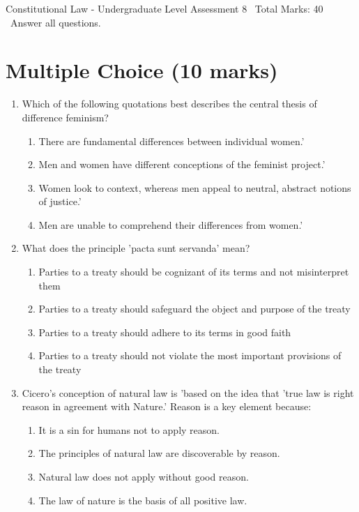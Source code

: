 \documentclass[12pt]{article}
\begin{document}
\begin{center}
Constitutional Law - Undergraduate Level Assessment 8 \
Total Marks: 40 \
Answer all questions.
\end{center}

\section*{Multiple Choice (10 marks)}
\begin{enumerate}[label=\arabic*.]
\item Which of the following quotations best describes the central thesis of difference feminism?
\begin{enumerate}[label=(\alph*)]
    \item There are fundamental differences between individual women.'
    \item Men and women have different conceptions of the feminist project.'
    \item Women look to context, whereas men appeal to neutral, abstract notions of justice.'
    \item Men are unable to comprehend their differences from women.'
\end{enumerate}
\item What does the principle 'pacta sunt servanda' mean?
\begin{enumerate}[label=(\alph*)]
    \item Parties to a treaty should be cognizant of its terms and not misinterpret them
    \item Parties to a treaty should safeguard the object and purpose of the treaty
    \item Parties to a treaty should adhere to its terms in good faith
    \item Parties to a treaty should not violate the most important provisions of the treaty
\end{enumerate}
\item Cicero's conception of natural law is 'based on the idea that 'true law is right reason in agreement with Nature.' Reason is a key element because:
\begin{enumerate}[label=(\alph*)]
    \item It is a sin for humans not to apply reason.
    \item The principles of natural law are discoverable by reason.
    \item Natural law does not apply without good reason.
    \item The law of nature is the basis of all positive law.

\end{enumerate}
\end{enumerate}
\end{document}
